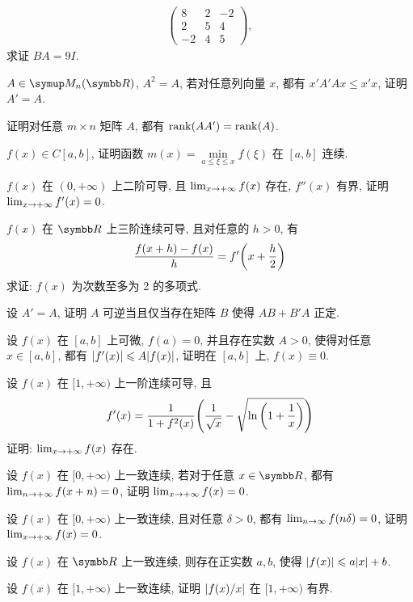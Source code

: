 \documentclass{ctexart}
\begin{document}
\begin{exercise}[series=exer]
\begin{align*}
\begin{pmatrix}
            8 & 2 & -2 \\
            2 & 5 & 4 \\
            -2 & 4 & 5
        \end{pmatrix},
    \end{align*}
    求证 $ BA = 9 I $. 
    \item $ A \in \MM $, $ A^{2} = A $, 若对任意列向量 $ x $, 都有 $ x'A'Ax \le x'x $, 证明 $ A' = A $.    
    \item 证明对任意 $ m \times n $ 矩阵 $ A $, 都有 $ \rank(AA') = \rank(A) $.  
    \item $ f(x) \in C[a, b] $, 证明函数 $ m(x) = \min\limits_{a \le \xi \le x}f(\xi) $ 在 $ [a, b] $ 连续.
    \item $ f(x) $ 在 $ (0, +\infty) $ 上二阶可导, 且 $ \lim_{x \to +\infty} f(x) $ 存在, $ f''(x) $ 有界, 证明 $ \lim_{x \to +\infty} f'(x) = 0 $.
    \item $ f(x) $ 在 $ \R $ 上三阶连续可导, 且对任意的 $ h > 0 $, 有
    \begin{align*}
        \frac{f(x + h) - f(x)}{h} = f'\qty(x + \frac{h}{2})
    \end{align*}
    求证: $ f(x) $ 为次数至多为 2 的多项式.
    \item 设 $ A' = A $, 证明 $ A $ 可逆当且仅当存在矩阵 $ B $ 使得 $ AB + B'A $ 正定.
    \item 设 $ f(x) $ 在 $ [a, b] $ 上可微, $ f(a) = 0 $, 并且存在实数 $ A > 0 $, 使得对任意 $ x \in [a, b] $, 都有 $ \abs{f'(x)} \leqslant A \abs{f(x)} $, 证明在 $ [a, b] $ 上, $ f(x) \equiv 0 $. 
    \item 设 $ f(x) $ 在 $ [1, +\infty) $ 上一阶连续可导, 且
    \begin{align*}
        f'(x) = \frac{1}{1 + f^{2}(x)}\qty(\frac{1}{\sqrt{x}} - \sqrt{\ln\qty(1 + \frac{1}{x})})
    \end{align*}
    证明: $ \lim_{x \to +\infty}f(x) $ 存在.
    \item 设 $ f(x) $ 在 $ [0, +\infty) $ 上一致连续, 若对于任意 $ x \in \R $, 都有 $ \lim_{n \to +\infty} f(x + n) = 0 $, 证明 $ \lim_{x \to +\infty} f(x) = 0 $.  
    \item 设 $ f(x) $ 在 $ [0, +\infty) $ 上一致连续, 且对任意 $ \delta > 0 $, 都有 $ \lim_{n \to \infty} f(n\delta) = 0 $, 证明 $ \lim_{x \to +\infty} f(x) = 0 $.  
    \item 设 $ f(x) $ 在 $ \R $ 上一致连续, 则存在正实数 $ a, b $, 使得 $ \abs{f(x)} \leqslant a\abs{x} + b $. 
    \item 设 $ f(x) $ 在 $ [1, +\infty) $ 上一致连续, 证明 $ \abs{f(x)/x} $ 在 $ [1, +\infty) $ 有界. 

\end{exercise}
\end{document}
